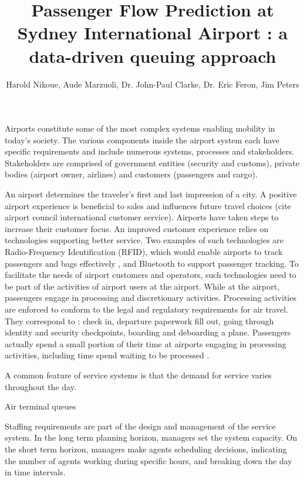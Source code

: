 \documentclass[11pt,onecolumn]{IEEEtran}
\begin{document}
\title{Passenger Flow Prediction at Sydney International Airport : a data-driven queuing approach}
\author{Harold Nikoue, Aude Marzuoli, Dr. John-Paul Clarke, Dr. Eric Feron, Jim Peters }
\maketitle
\IEEEpeerreviewmaketitle
Airports constitute some of the most complex systems enabling mobility in today's society. The various components inside the airport system each have specific requirements and include numerous systems, processes and stakeholders. Stakeholders are comprised of government entities (security and customs), private bodies (airport owner, airlines) and customers (passengers and cargo).

An airport determines the traveler's first and last impression of a city. A positive airport experience is beneficial to sales and influences future travel choices (cite airport council international customer service). Airports have taken steps to increase their customer focus. An improved customer experience relies on technologies supporting better service. Two examples of such technologies are Radio-Frequency Identification (RFID), which would enable airports to track passengers and bags effectively \cite{devries2008state} \cite{wyld2005my}, and Bluetooth \cite{hansen2009location} to support passenger tracking. To facilitate the needs of airport customers and operators, such technologies need to be part of the activities of airport users at the airport. While at the airport, passengers engage in processing and discretionary activities. Processing activities are enforced to conform to the legal and regulatory requirements for air travel. They correspond to : check in, departure paperwork fill out, going through identity and security checkpoints, boarding and deboarding a plane. Passengers actually spend a small portion of their time at airports engaging in processing activities, including time spend waiting to be processed \cite{takakuwa2003modeling}. 




A common feature of service systems is that the demand for service varies throughout the day. 

Air terminal queues \cite{koopman1972air}

Staffing requirements are part of the design and management of the service system. In the long term planning horizon, managers set the system capacity. On the short term horizon, managers make agents scheduling decisions, indicating the number of agents working during specific hours, and breaking down the day in time intervals.
\end{document}
